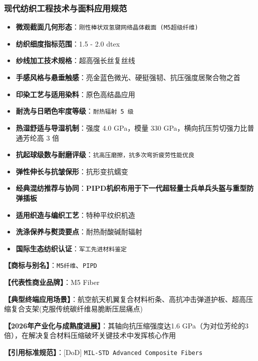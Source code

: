 \documentclass[11pt,openright,twoside,UTF8]{ctexbook}
\begin{document}
\subsubsection*{现代纺织工程技术与面料应用规范}
\begin{itemize} \setlength{\itemsep}{2pt}
    \item \textbf{微观截面几何形态}：\texttt{刚性棒状双氢键网络晶体截面 (M5超级纤维)}
    \item \textbf{纺织细度指标范围}：1.5 - 2.0 dtex
    \item \textbf{纱线加工技术规格}：超高强长丝复丝线
    \item \textbf{手感风格与悬垂触感}：亮金蓝色微光、硬挺强韧、抗压强度居聚合物之首
    \item \textbf{印染工艺与适用染料}：原色高结晶应用
    \item \textbf{耐洗与日晒色牢度等级}：\texttt{耐热辐射 5 级}
    \item \textbf{热湿舒适与导湿机制}：强度 4.0 GPa，模量 330 GPa，横向抗压剪切强力比普通芳纶高 3 倍
    \item \textbf{抗起球级数与耐磨评级}：\texttt{抗高压磨擦，抗多次弯折疲劳性能优良}
    \item \textbf{弹性伸长与抗皱保形}：抗形变抗蠕变
    \item \textbf{经典混纺推荐与协同}：\textbf{PIPD机织布用于下一代超轻量士兵单兵头盔与重型防弹插板}
    \item \textbf{适用织造与编织工艺}：特种平纹织机造
    \item \textbf{洗涤保养与熨烫要点}：耐热耐酸碱耐辐射
    \item \textbf{国际生态纺织认证}：\texttt{军工先进材料鉴定}
\end{itemize}
\vspace{0.2cm}

\noindent\textbf{【商标与别名】}：\texttt{M5纤维}、\texttt{PIPD}\par
\noindent\textbf{【代表性商业品牌】}：M5 Fiber\par
\noindent\textbf{【典型终端应用场景】}：航空航天机翼复合材料桁条、高抗冲击弹道护板、超高压缩复合支架(克服传统碳纤维易脆断压屈痛点)\par
\noindent\textbf{【2026年产业化与成熟度进展】}：其轴向抗压缩强度达1.6 GPa（为对位芳纶的3倍），在解决复合材料压缩破坏关键技术中发挥核心作用\par
\noindent\textbf{【引用标准规范】}：[DoD] \texttt{MIL-STD Advanced Composite Fibers}\par
\vspace{0.5cm}
\end{document}
